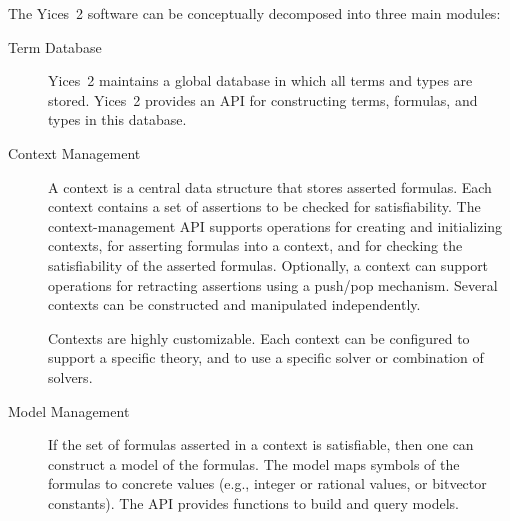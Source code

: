 \documentclass[11pt,twoside,fleqn,openright,titlepage]{cslreport}
\begin{document}
The Yices~2  software can be  conceptually decomposed into  three main
modules:
\begin{description}
\item[Term Database] Yices~2 maintains  a global database in which all
  terms and types are stored. Yices~2 provides an API for constructing
  terms, formulas, and types in this database.

\item[Context Management] A  context is a central  data structure that
  stores asserted formulas. Each context  contains a set of assertions
  to  be  checked  for  satisfiability.   The  context-management  API
  supports  operations for  creating  and  initializing contexts,  for
  asserting   formulas  into   a   context,  and   for  checking   the
  satisfiability of the asserted  formulas.  Optionally, a context can
  support  operations  for  retracting  assertions  using  a  push/pop
  mechanism.  Several  contexts  can be  constructed  and  manipulated
  independently.

  Contexts are highly customizable.  Each context can be configured to
  support  a  specific  theory,  and  to  use  a  specific  solver  or
  combination of solvers.

\item[Model Management] If  the set of formulas asserted  in a context
  is satisfiable, then one can construct  a model of the formulas. The
  model maps symbols of the formulas to concrete values (e.g., integer
  or  rational  values, or  bitvector  constants).   The API  provides
  functions to build and query models.
\end{description}
\end{document}
